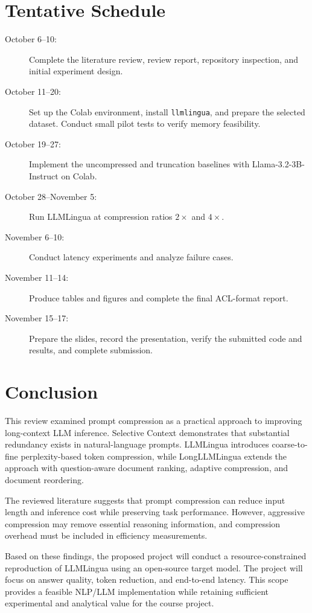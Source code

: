 \documentclass[10pt,a4paper,twocolumn]{article}
\begin{document}
\section{Tentative Schedule}

\begin{description}
    \item[October 6--10:] Complete the literature review, review report, repository inspection, and initial experiment design.
    \item[October 11--20:] Set up the Colab environment, install \texttt{llmlingua}, and prepare the selected dataset. Conduct small pilot tests to verify memory feasibility.
    \item[October 19--27:] Implement the uncompressed and truncation baselines with Llama-3.2-3B-Instruct on Colab.
    \item[October 28--November 5:] Run LLMLingua at compression ratios $2\times$ and $4\times$.
    \item[November 6--10:] Conduct latency experiments and analyze failure cases.
    \item[November 11--14:] Produce tables and figures and complete the final ACL-format report.
    \item[November 15--17:] Prepare the slides, record the presentation, verify the submitted code and results, and complete submission.
\end{description}

\section{Conclusion}

This review examined prompt compression as a practical approach to improving long-context LLM inference. Selective Context demonstrates that substantial redundancy exists in natural-language prompts. LLMLingua introduces coarse-to-fine perplexity-based token compression, while LongLLMLingua extends the approach with question-aware document ranking, adaptive compression, and document reordering.

The reviewed literature suggests that prompt compression can reduce input length and inference cost while preserving task performance. However, aggressive compression may remove essential reasoning information, and compression overhead must be included in efficiency measurements.

Based on these findings, the proposed project will conduct a resource-constrained reproduction of LLMLingua using an open-source target model. The project will focus on answer quality, token reduction, and end-to-end latency. This scope provides a feasible NLP/LLM implementation while retaining sufficient experimental and analytical value for the course project.
\end{document}
